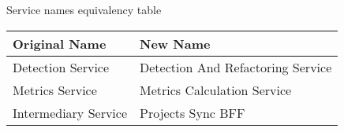 \begin{tabframed}[!ht]
    \centering
    \caption{Service names equivalency table}
\begin{tabular}{|l|l|}
        \toprule
        \textbf{Original Name} & \textbf{New Name} \\
        \midrule
        Detection Service & Detection And Refactoring Service \\
        Metrics Service & Metrics Calculation Service \\
        Intermediary Service & Projects Sync BFF \\
        \bottomrule
    \end{tabular}
    \label{tab-services-map}
\end{tabframed}